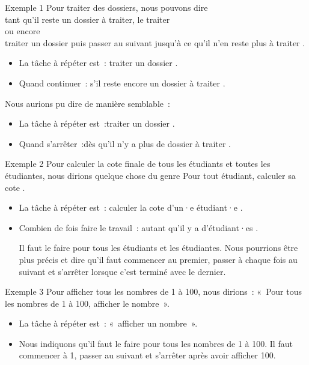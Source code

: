 \begin{hideedit}
\begin{frame}{Exemple 1}
  Pour traiter des dossiers, nous pouvons dire\\
  \og tant qu’il reste un dossier à traiter, le traiter \fg \\
  \pause
  ou encore\\
  \og traiter un dossier puis passer au suivant jusqu’à ce qu’il n’en
  reste plus à traiter \fg.
  \pause
  \begin{itemize}
    \item La tâche à répéter est~: \pause \og traiter un dossier \fg.
    \item Quand continuer~: \pause \og s’il reste encore un dossier à traiter \fg.
  \end{itemize}
  \pause
  Nous aurions pu dire de manière semblable~:
  \begin{itemize}
    \item La tâche à répéter est~:\pause \og traiter un dossier \fg.
    \item Quand s'arrêter~:\pause \og dès qu'il n'y a plus de dossier à traiter \fg.
  \end{itemize}
\end{frame}

\begin{frame}{Exemple 2}
  Pour calculer la cote finale de tous les étudiants et toutes les étudiantes,
  nous dirions quelque chose du genre
  \og Pour tout étudiant, calculer sa cote \fg.
  \begin{itemize}
  \item
    La tâche à répéter est~: \og calculer la cote d’un·e étudiant·e \fg.
  \item
    Combien de fois faire le travail~: \og autant qu'il y a d'étudiant·es \fg.

    \pause
    Il faut le faire pour tous les étudiants et les étudiantes. Nous
    pourrions être plus précis et dire qu'il faut commencer au premier,
    passer à chaque fois au suivant et s'arrêter lorsque c'est terminé avec
    le dernier.
\end{itemize}
\end{frame}

\begin{frame}{Exemple 3}
  Pour afficher tous les nombres de 1 à 100, nous dirions~:
  «~Pour tous les nombres de 1 à 100, afficher le nombre~».
  \begin{itemize}
  \item
    La tâche à répéter est~: «~afficher un nombre~».
  \item
    Nous indiquons qu'il faut le faire pour tous les nombres de 1 à 100. Il
    faut commencer à 1, passer au suivant et s'arrêter après avoir afficher
    100.
\end{itemize}
\end{frame}


\end{hideedit}
